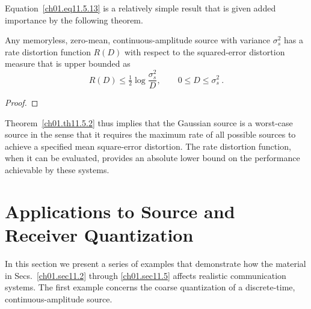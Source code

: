 Equation~\eqref{ch01.eq11.5.13} is a relatively simple result that
is given added importance by the following theorem.

\begin{theorem}
\label{ch01.th11.5.2}
Any memoryless, zero-mean, continuous-amplitude source with
variance $\sigma^2_s$ has a rate distortion function $R(D)$
with respect to the squared-error distortion  measure that is
upper bounded as
\begin{equation}
        R(D) \leq \tfrac{1}{2} \log \frac{\sigma^2_s}{D},
           \qquad 0 \leq D \leq \sigma^2_s~.
\label{ch01.eq11.5.14}
\end{equation}
\end{theorem}

\begin{proof}
\end{proof}

Theorem~\ref{ch01.th11.5.2} thus implies that the Gaussian source
is a worst-case source in the sense that it requires the maximum
rate of all possible sources to achieve a specified mean square-error
distortion.
The rate distortion function, when it can be evaluated, provides
an absolute lower bound on the performance achievable by these systems.


\section{Applications to Source and Receiver Quantization}
\label{ch01.sec11.6}

In this section we present a series of examples that demonstrate
how the material in Secs.~\ref{ch01.sec11.2} through \ref{ch01.sec11.5}
affects realistic communication systems.
The first example concerns the coarse quantization of a discrete-time,
continuous-amplitude source.

